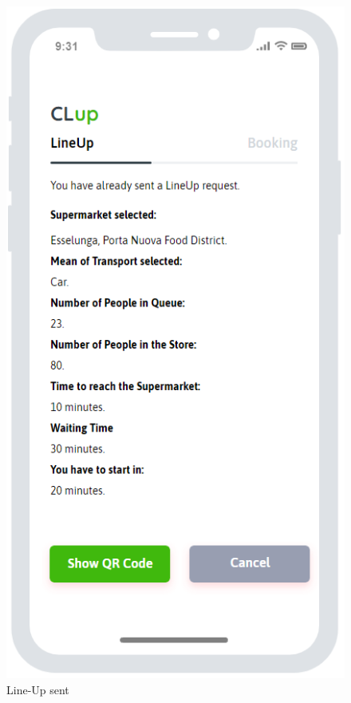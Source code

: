 \begin{figure}[H]
\begin{minipage}{0.3\linewidth} 
\includegraphics[width=\textwidth]{./Images/MockupLogo/mockLineUpSent}
\caption{Line-Up sent}
\end{minipage} 

\end{figure}

